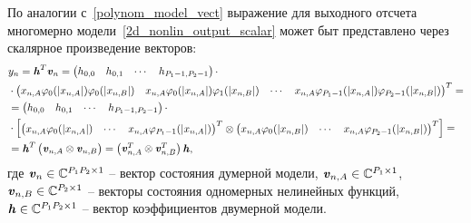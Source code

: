 По аналогии с~\eqref{polynom_model_vect} выражение для выходного отсчета многомерно модели~\eqref{2d_nonlin_output_scalar} может быт представлено через скалярное произведение векторов:
\begin{align}
	&y_n=\textbf{\textit{h}}^T\textbf{\textit{v}}_n=
	\begin{pmatrix}
		h_{0, 0} & h_{0, 1} & \cdots & h_{P_1-1, P_2-1}
	\end{pmatrix}\cdot \nonumber \\
	& \cdot\begin{pmatrix}
		x_{n, A}\varphi_{0}(|x_{n, A}|)\varphi_{0}(|x_{n, B}|) & 
		x_{n, A}\varphi_{0}(|x_{n, A}|)\varphi_{1}(|x_{n, B}|) & 
		\cdots &
		x_{n, A}\varphi_{P_1-1}(|x_{n, A}|)\varphi_{P_2-1}(|x_{n, B}|)
	\end{pmatrix}^T= \nonumber \\
	&=\begin{pmatrix}
		h_{0, 0} & h_{0, 1} & \cdots & h_{P_1-1, P_2-1}
	\end{pmatrix}\cdot \nonumber \\
	&\cdot\begin{bmatrix}
		\begin{pmatrix}
			x_{n, A}\varphi_{0}(|x_{n, A}|) & 
			\cdots & 
			x_{n, A}\varphi_{P_1-1}(|x_{n, A}|)
		\end{pmatrix}^T \otimes
		\begin{pmatrix}
			x_{n, A}\varphi_{0}(|x_{n, B}|) & 
			\cdots & 
			x_{n, A}\varphi_{P_2-1}(|x_{n, B}|)
		\end{pmatrix}^T
	\end{bmatrix}= \nonumber \\
	&=\textbf{\textit{h}}^T
	\begin{pmatrix}
		\textbf{\textit{v}}_{n, A} \otimes \textbf{\textit{v}}_{n, B}
	\end{pmatrix}=
	\begin{pmatrix}
		\textbf{\textit{v}}_{n, A}^T \otimes \textbf{\textit{v}}_{n, B}^T
	\end{pmatrix}\textbf{\textit{h}},
	\label{2d_nonlin_output_scalar_vect}
\end{align}
где $\textbf{\textit{v}}_{n}\in\mathbb{C}^{P_1P_2\times1}$ -- вектор состояния думерной модели, $\textbf{\textit{v}}_{n, A}\in\mathbb{C}^{P_1\times1}$, $\textbf{\textit{v}}_{n, B}\in\mathbb{C}^{P_2\times1}$ -- векторы состояния одномерных нелинейных функций, $\textbf{\textit{h}}\in\mathbb{C}^{P_1P_2\times1}$ -- вектор коэффициентов двумерной модели.

